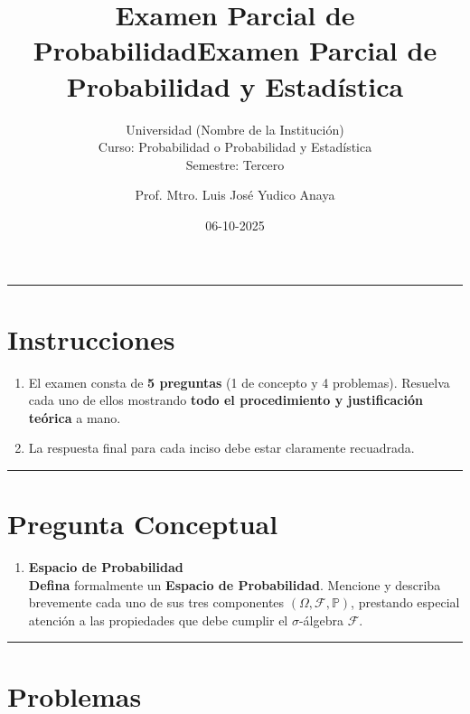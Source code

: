 \documentclass[12pt, a4paper]{article}
\title{\textbf{Examen Parcial de Probabilidad}}
\author{Universidad (Nombre de la Institución) \\ \small Curso: Probabilidad o Probabilidad y Estadística \\ \small Semestre: Tercero}
\title{Examen Parcial de Probabilidad y Estad\'istica}
\author{Prof. Mtro. Luis Jos\'{e} Yudico Anaya}
\date{06-10-2025}
\begin{document}
\maketitle
\thispagestyle{empty} %



\noindent\rule{\linewidth}{0.5pt}

\section*{Instrucciones}
\begin{enumerate}
    \item El examen consta de \textbf{5 preguntas} (1 de concepto y 4 problemas). Resuelva cada uno de ellos mostrando \textbf{todo el procedimiento y justificación teórica} a mano.
    \item La respuesta final para cada inciso debe estar claramente recuadrada.
\end{enumerate}

\noindent\rule{\linewidth}{0.5pt}

\section*{Pregunta Conceptual}
\begin{enumerate}
    \item[\textbf{C-1.}] \textbf{Espacio de Probabilidad}
    \\
    \textbf{Defina} formalmente un \textbf{Espacio de Probabilidad}. Mencione y describa brevemente cada uno de sus tres componentes $(\Omega, \mathcal{F}, \mathbb{P})$, prestando especial atención a las propiedades que debe cumplir el $\sigma$-álgebra $\mathcal{F}$.
\end{enumerate}

\noindent\rule{\linewidth}{0.5pt}

\section*{Problemas}
\end{document}
